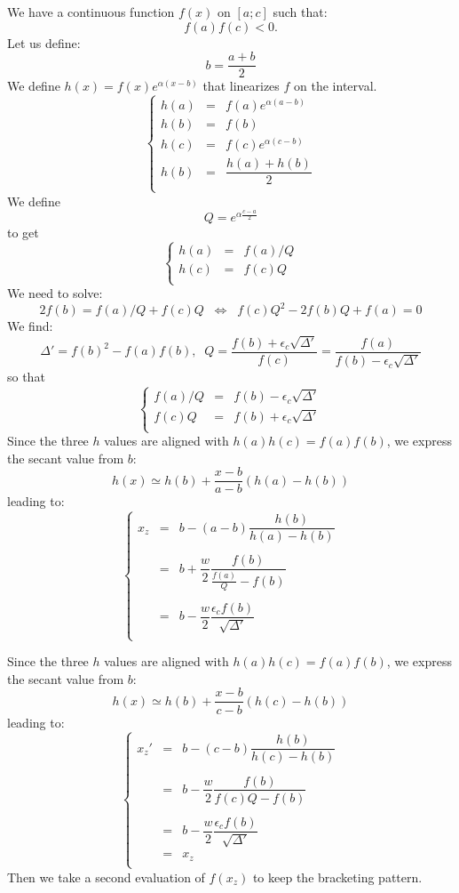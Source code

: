 \documentclass[aps,12pt]{revtex4}
\begin{document}
We have a continuous function $f(x)$ on $[a;c]$ such that:
 $$f(a)f(c)<0.$$
Let us define:
$$
	b = \dfrac{a+b}{2}
$$
We define $h(x)=f(x)e^{\alpha(x-b)}$ that linearizes $f$ on the interval.
$$
\left\lbrace
\begin{array}{rcl}
	h(a) & = & f(a)e^{\alpha(a-b)}\\
	h(b) & = & f(b)\\
	h(c) & = & f(c) e^{\alpha(c-b)}\\
	h(b) & = & \dfrac{h(a)+h(b)}{2}\\
\end{array}
\right.
$$
We define
$$
Q = e^{\alpha\frac{c-a}{2}}
$$
to get
$$	
\left\lbrace
\begin{array}{rcl}
	h(a) & = & f(a)/Q\\
 	h(c) & = & f(c)Q\\
\end{array}
\right.
$$
We need to solve:
$$
	2f(b) = f(a)/Q+f(c)Q \;\; \Leftrightarrow \;\; f(c)Q^2 - 2 f(b) Q + f(a) = 0
$$
We find:
$$
	\Delta' = f(b)^2 - f(a)f(b), \;\; Q = \dfrac{f(b)+\epsilon_c \sqrt{\Delta'}}{f(c)} = \dfrac{f(a)}{f(b)-\epsilon_c \sqrt{\Delta'}}
$$
so that
$$
\left\lbrace
\begin{array}{rcl}
	f(a)/Q & = & f(b) - \epsilon_c \sqrt{\Delta'}\\
	f(c) Q & = & f(b) + \epsilon_c \sqrt{\Delta'}\\
\end{array}
\right.
$$
Since the three $h$ values are aligned with $h(a)h(c)=f(a)f(b)$, we express the secant value from $b$:
$$
	h(x) \simeq h(b) + \dfrac{x-b}{a-b} \left( h(a) - h(b) \right)
$$
leading to:
$$
\left\lbrace
\begin{array}{rcl}
	x_z & = & b - (a-b) \dfrac{h(b)}{h(a)-h(b)} \\
	\\
	& = & b + \dfrac{w}{2} \dfrac{f(b)}{\frac{f(a)}{Q}-f(b)}\\
	\\
	& = & b - \dfrac{w}{2} \dfrac{\epsilon_c f(b)}{\sqrt{\Delta'}}\\
\end{array}
\right.
$$

Since the three $h$ values are aligned with $h(a)h(c)=f(a)f(b)$, we express the secant value from $b$:
$$
	h(x) \simeq h(b) + \dfrac{x-b}{c-b} \left( h(c) - h(b) \right)
$$
leading to:
$$
\left\lbrace
\begin{array}{rcl}
	x_z' & = & b - (c-b) \dfrac{h(b)}{h(c)-h(b)} \\
	\\
	& = & b  - \dfrac{w}{2} \dfrac{f(b)}{f(c)Q-f(b)}\\
	\\
	& = & b - \dfrac{w}{2} \dfrac{\epsilon_c f(b)}{\sqrt{\Delta'}}\\
	& = & x_z\\
\end{array}
\right.
$$
Then we take a second evaluation of $f(x_z)$ to keep the bracketing pattern.
\end{document}

